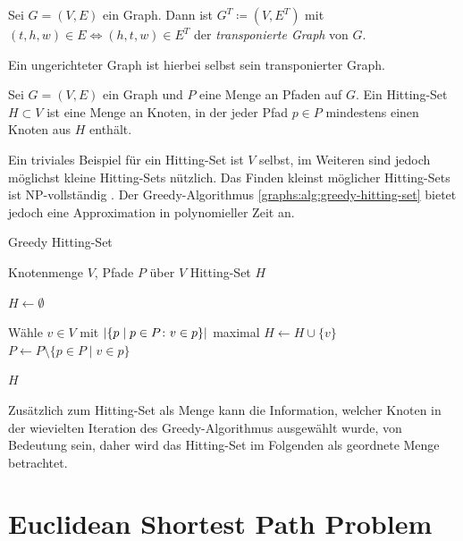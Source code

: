 \begin{definition}
  Sei $G = (V, E)$ ein Graph. Dann ist $G^T \coloneq (V, E^T)$ mit $(t, h, w) \in E \Leftrightarrow (h, t, w) \in E^T$ der \emph{transponierte Graph} von $G$.
\end{definition}

Ein ungerichteter Graph ist hierbei selbst sein transponierter Graph.

\begin{definition}
  Sei $G = (V, E)$ ein Graph und $P$ eine Menge an Pfaden auf $G$.
  Ein Hitting-Set $H \subset V$ ist eine Menge an Knoten, in der jeder Pfad $p \in P$ mindestens einen Knoten aus $H$ enthält.
\end{definition}

Ein triviales Beispiel für ein Hitting-Set ist $V$ selbst, im Weiteren sind jedoch möglichst kleine Hitting-Sets nützlich.
Das Finden kleinst möglicher Hitting-Sets ist NP-vollständig \cite{Kar72}.
Der Greedy-Algorithmus \ref{graphs:alg:greedy-hitting-set} bietet jedoch eine Approximation in polynomieller Zeit an.

\begin{algorithm}
  \caption{Greedy Hitting-Set}
  \begin{algorithmic}[1]
    \Require Knotenmenge $V$, Pfade $P$ über $V$
    \Ensure Hitting-Set $H$

    \State $H \gets \emptyset$

    \State

    \State Wähle $v \in V$ mit $\abs{ \{ p \mid p \in P \colon v \in p \}}$ maximal
    \State $H \gets H \cup \{  v \}$
    \State $P \gets P \setminus \{p \in P \mid v \in p\}$
    \EndWhile

    \State

    \State \Return $H$
  \end{algorithmic}
  \label{graphs:alg:greedy-hitting-set}
\end{algorithm}

Zusätzlich zum Hitting-Set als Menge kann die Information, welcher Knoten in der wievielten Iteration des Greedy-Algorithmus ausgewählt wurde, von Bedeutung sein, daher wird das Hitting-Set im Folgenden als geordnete Menge betrachtet.

\section{Euclidean Shortest Path Problem}

